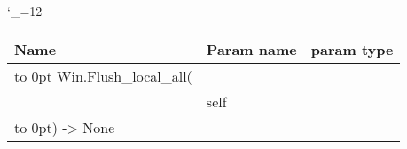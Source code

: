 \begingroup \catcode`\_=12 \tt
\begin{tabular}{lll}
\toprule
\textrm{Name}&\textrm{Param name}&\textrm{param type}\\
\midrule
\hbox to 0pt {Win.Flush_local_all(\hss}\\
& self\\
\hbox to 0pt{) -> None\hss}\\
\bottomrule
\end{tabular}
\endgroup

